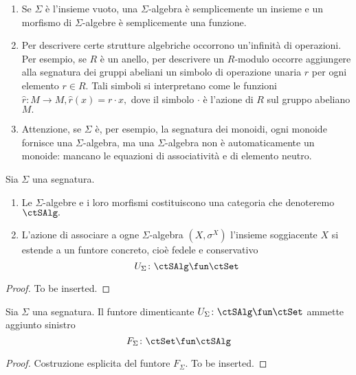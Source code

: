 \begin{examples}\label{esempi_sigma_alg}
\hfill
\begin{enumerate}
\item Se $\Sigma$ è l'insieme vuoto, una $\Sigma$-algebra è semplicemente un insieme e un morfismo di $\Sigma$-algebre è 
semplicemente una funzione.
\item Per descrivere certe strutture algebriche occorrono un'infinità di operazioni. Per esempio, se $R$ è un anello, per descrivere un 
$R$-modulo occorre aggiungere alla segnatura dei gruppi abeliani un simbolo di operazione unaria $\widehat{r}$ per ogni elemento $r \in R.$
Tali simboli si interpretano come le funzioni $\widehat{r} \colon M \to M, \widehat{r}(x) = r \cdot x,$ dove il simbolo $\cdot$ è l'azione di $R$ 
sul gruppo abeliano $M.$
\item Attenzione, se $\Sigma$ è, per esempio, la segnatura dei monoidi, ogni monoide fornisce una $\Sigma$-algebra, ma una $\Sigma$-algebra 
non è automaticamente un monoide: mancano le equazioni di associatività e di elemento neutro.
\end{enumerate}
\end{examples} 

\begin{proposition}\label{prop_cat_sigma_alg}
Sia $\Sigma$ una segnatura.
\begin{enumerate}
\item Le $\Sigma$-algebre e i loro morfismi costituiscono una categoria che denoteremo $\ctSAlg.$
\item L'azione di associare a ogne $\Sigma$-algebra $(X,\sigma^X)$ l'insieme soggiacente $X$ si estende a un funtore concreto, cioè fedele e
conservativo
$$U_{\Sigma} \colon \ctSAlg \fun \ctSet$$
\end{enumerate}
\end{proposition}

\begin{proof}
To be inserted.
\end{proof} 

\begin{proposition}\label{prop_alg_libera}
Sia $\Sigma$ una segnatura. Il funtore dimenticante $U_{\Sigma} \colon \ctSAlg \fun \ctSet$ ammette aggiunto sinistro
$$F_{\Sigma} \colon \ctSet \fun \ctSAlg$$
\end{proposition} 

\begin{proof}
Costruzione esplicita del funtore $F_{\Sigma}.$ To be inserted.
\end{proof}

